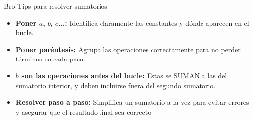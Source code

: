 \documentclass[aspectratio=169]{beamer}
\begin{document}
\begin{frame}{Bro Tips para resolver sumatorios}
\begin{itemize}
    \item \textbf{Poner \(a\), \(b\), \(c\)...:} Identifica claramente las constantes y dónde aparecen en el bucle.
    \item \textbf{Poner paréntesis:} Agrupa las operaciones correctamente para no perder términos en cada paso.
    \item \textbf{\(b\) son las operaciones antes del bucle:} Estas se SUMAN a las del sumatorio interior, y deben incluirse fuera del segundo sumatorio.
    \item \textbf{Resolver paso a paso:} Simplifica un sumatorio a la vez para evitar errores y asegurar que el resultado final sea correcto.
\end{itemize}
\end{frame}
\end{document}
